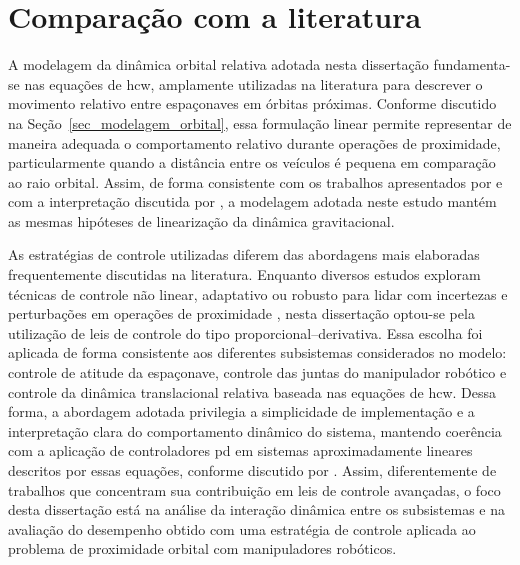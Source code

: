 \section{Comparação com a literatura}
\label{sec_comparacao_literatura}

A modelagem da dinâmica orbital relativa adotada nesta dissertação fundamenta-se nas equações de \gls{hcw}, amplamente utilizadas na literatura para descrever o movimento relativo entre espaçonaves em órbitas próximas.
Conforme discutido na Seção~\ref{sec_modelagem_orbital}, essa formulação linear permite representar de maneira adequada o comportamento relativo durante operações de proximidade, particularmente quando a distância entre os veículos é pequena em comparação ao raio orbital.
Assim, de forma consistente com os trabalhos apresentados por \cite{clohessy1960terminal} e com a interpretação discutida por \cite{fehse2003}, a modelagem adotada neste estudo mantém as mesmas hipóteses de linearização da dinâmica gravitacional.

As estratégias de controle utilizadas diferem das abordagens mais elaboradas frequentemente discutidas na literatura. 
Enquanto diversos estudos exploram técnicas de controle não linear, adaptativo ou robusto para lidar com incertezas e perturbações em operações de proximidade \cite{slotine1991applied}, nesta dissertação optou-se pela utilização de leis de controle do tipo proporcional--derivativa.
Essa escolha foi aplicada de forma consistente aos diferentes subsistemas considerados no modelo: controle de atitude da espaçonave, controle das juntas do manipulador robótico e controle da dinâmica translacional relativa baseada nas equações de \gls{hcw}. Dessa forma, a abordagem adotada privilegia a simplicidade de implementação e a interpretação clara do comportamento dinâmico do sistema, mantendo coerência com a aplicação de controladores \gls{pd} em sistemas aproximadamente lineares descritos por essas equações, conforme discutido por \cite{qi2022variable}.
Assim, diferentemente de trabalhos que concentram sua contribuição em leis de controle avançadas, o foco desta dissertação está na análise da interação dinâmica entre os subsistemas e na avaliação do desempenho obtido com uma estratégia de controle aplicada ao problema de proximidade orbital com manipuladores robóticos.

